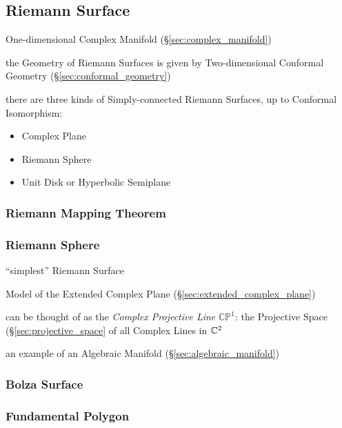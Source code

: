 \subsection{Riemann Surface}\label{sec:riemann_surface}

One-dimensional Complex Manifold (\S\ref{sec:complex_manifold})

the Geometry of Riemann Surfaces is given by Two-dimensional Conformal
Geometry (\S\ref{sec:conformal_geometry})

there are three kinds of Simply-connected Riemann Surfaces, up to Conformal
Isomorphism:
\begin{itemize}
  \item Complex Plane
  \item Riemann Sphere
  \item Unit Disk or Hyperbolic Semiplane
\end{itemize}



\subsubsection{Riemann Mapping Theorem}
\label{sec:riemann_mapping_theorem}

\subsubsection{Riemann Sphere}\label{sec:riemann_sphere}

``simplest'' Riemann Surface

Model of the Extended Complex Plane
(\S\ref{sec:extended_complex_plane})

can be thought of as the \emph{Complex Projective Line}
$\mathbb{CP}^1$: the Projective Space (\S\ref{sec:projective_space} of
all Complex Lines in $\mathbb{C}^2$

an example of an Algebraic Manifold (\S\ref{sec:algebraic_manifold})



\subsubsection{Bolza Surface}\label{sec:bolza_surface}

\subsubsection{Fundamental Polygon}\label{sec:fundamental_polygon}




